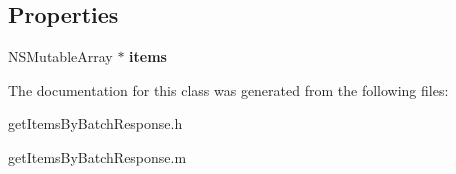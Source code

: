 \subsection*{Properties}
\begin{DoxyCompactItemize}
\item 
\hypertarget{interfaceget_items_by_batch_response_abb7beccf12b94c14d676d17abcac5877}{}N\+S\+Mutable\+Array $\ast$ {\bfseries items}\label{interfaceget_items_by_batch_response_abb7beccf12b94c14d676d17abcac5877}

\end{DoxyCompactItemize}


The documentation for this class was generated from the following files\+:\begin{DoxyCompactItemize}
\item 
get\+Items\+By\+Batch\+Response.\+h\item 
get\+Items\+By\+Batch\+Response.\+m\end{DoxyCompactItemize}
